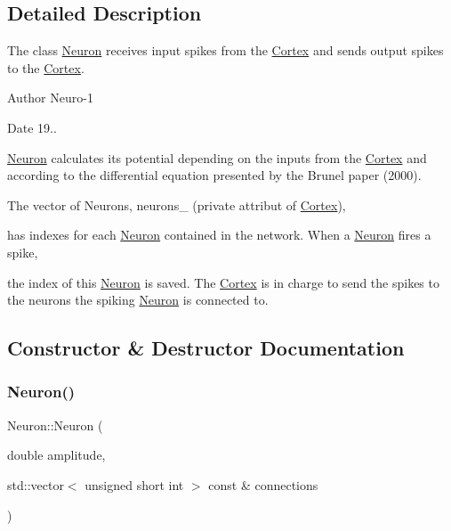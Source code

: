 \subsection{Detailed Description}
The class \hyperlink{class_neuron}{Neuron} receives input spikes from the \hyperlink{class_cortex}{Cortex} and sends output spikes to the \hyperlink{class_cortex}{Cortex}. 

\begin{DoxyAuthor}{Author}
Neuro-\/1
\end{DoxyAuthor}
\begin{DoxyDate}{Date}
19..
\end{DoxyDate}
\hyperlink{class_neuron}{Neuron} calculates its potential depending on the inputs from the \hyperlink{class_cortex}{Cortex} and according to the differential equation presented by the Brunel paper (2000).

The vector of Neurons, neurons\+\_\+ (private attribut of \hyperlink{class_cortex}{Cortex}),

has indexes for each \hyperlink{class_neuron}{Neuron} contained in the network. When a \hyperlink{class_neuron}{Neuron} fires a spike,

the index of this \hyperlink{class_neuron}{Neuron} is saved. The \hyperlink{class_cortex}{Cortex} is in charge to send the spikes to the neurons the spiking \hyperlink{class_neuron}{Neuron} is connected to. 

\subsection{Constructor \& Destructor Documentation}
\hypertarget{class_neuron_a8e6997ac7838c5e6ff3e961aa9d559b2}{}\label{class_neuron_a8e6997ac7838c5e6ff3e961aa9d559b2} 
\subsubsection{\texorpdfstring{Neuron()}{Neuron()}\hspace{0.1cm}{\footnotesize\ttfamily [1/2]}}
{\footnotesize\ttfamily Neuron\+::\+Neuron (\begin{DoxyParamCaption}\item[{double}]{amplitude,  }\item[{std\+::vector$<$ unsigned short int $>$ const \&}]{connections }\end{DoxyParamCaption})}




